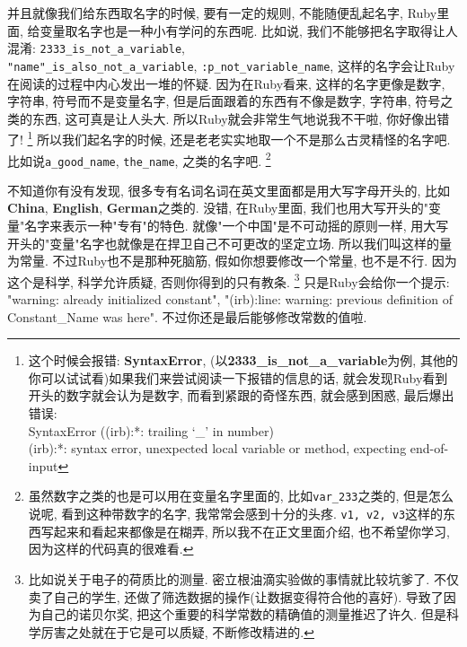 并且就像我们给东西取名字的时候, 要有一定的规则, 不能随便乱起名字, Ruby里面, 给变量取名字也是一种小有学问的东西呢. 比如说, 我们不能够把名字取得让人混淆: \texttt{2333_is_not_a_variable}, \\\texttt{"name"_is_also_not_a_variable}, \texttt{:p_not_variable_name}, 这样的名字会让Ruby在阅读的过程中内心发出一堆的怀疑. 因为在Ruby看来, 这样的名字更像是数字, 字符串, 符号而不是变量名字, 但是后面跟着的东西有不像是数字, 字符串, 符号之类的东西, 这可真是让人头大. 所以Ruby就会非常生气地说我不干啦, 你好像出错了! \footnote{这个时候会报错: \textbf{SyntaxError}, (以\textbf{2333\_is\_not\_a\_variable}为例, 其他的你可以试试看)如果我们来尝试阅读一下报错的信息的话, 就会发现Ruby看到开头的数字就会认为是数字, 而看到紧跟的奇怪东西, 就会感到困惑, 最后爆出错误: \\ SyntaxError ((irb):*: trailing `\_' in number)\\(irb):*: syntax error, unexpected local variable or method, expecting end-of-input} 所以我们起名字的时候, 还是老老实实地取一个不是那么古灵精怪的名字吧. 比如说\texttt{a_good_name}, \texttt{the_name}, 之类的名字吧. \footnote{虽然数字之类的也是可以用在变量名字里面的, 比如\texttt{var_233}之类的, 但是怎么说呢, 看到这种带数字的名字, 我常常会感到十分的头疼. \texttt{v1, v2, v3}这样的东西写起来和看起来都像是在糊弄, 所以我不在正文里面介绍, 也不希望你学习, 因为这样的代码真的很难看. }

不知道你有没有发现, 很多专有名词名词在英文里面都是用大写字母开头的, 比如\textbf{China}, \textbf{English}, \textbf{German}之类的. 没错, 在Ruby里面, 我们也用大写开头的"变量"名字来表示一种"专有"的特色. 就像"一个中国"是不可动摇的原则一样, 用大写开头的"变量"名字也就像是在捍卫自己不可更改的坚定立场. 所以我们叫这样的量为常量. 不过Ruby也不是那种死脑筋, 假如你想要修改一个常量, 也不是不行. 因为这个是科学, 科学允许质疑, 否则你得到的只有教条. \footnote{比如说关于电子的荷质比的测量. 密立根油滴实验做的事情就比较坑爹了. 不仅卖了自己的学生, 还做了筛选数据的操作(让数据变得符合他的喜好). 导致了因为自己的诺贝尔奖, 把这个重要的科学常数的精确值的测量推迟了许久. 但是科学厉害之处就在于它是可以质疑, 不断修改精进的. } 只是Ruby会给你一个提示: "warning: already initialized constant", "(irb):line: warning: previous definition of Constant\_Name was here". 不过你还是最后能够修改常数的值啦. 

